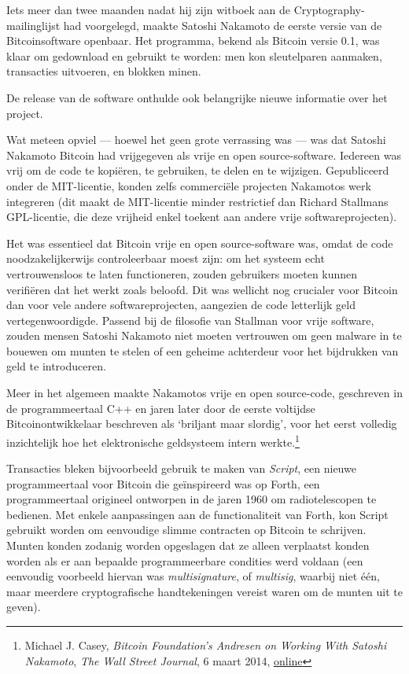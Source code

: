 \documentclass[
  a5paper,
  smalldemyvopaper,11pt,twoside,onecolumn,openright,extrafontsizes,
hidelinks]{memoir}
\begin{document}
Iets meer dan twee maanden nadat hij zijn witboek aan de
Cryptography-mailinglijst had voorgelegd, maakte Satoshi Nakamoto de
eerste versie van de Bitcoinsoftware openbaar. Het programma, bekend als
Bitcoin versie 0.1, was klaar om gedownload en gebruikt te worden: men
kon sleutelparen aanmaken, transacties uitvoeren, en blokken minen.

De release van de software onthulde ook belangrijke nieuwe informatie
over het project.

Wat meteen opviel --- hoewel het geen grote verrassing was --- was dat
Satoshi Nakamoto Bitcoin had vrijgegeven als vrije en open
source-software. Iedereen was vrij om de code te kopiëren, te gebruiken,
te delen en te wijzigen. Gepubliceerd onder de MIT-licentie, konden
zelfs commerciële projecten Nakamotos werk integreren (dit maakt de
MIT-licentie minder restrictief dan Richard Stallmans GPL-licentie, die
deze vrijheid enkel toekent aan andere vrije softwareprojecten).

Het was essentieel dat Bitcoin vrije en open source-software was, omdat
de code noodzakelijkerwijs controleerbaar moest zijn: om het systeem
echt vertrouwensloos te laten functioneren, zouden gebruikers moeten
kunnen verifiëren dat het werkt zoals beloofd. Dit was wellicht nog
crucialer voor Bitcoin dan voor vele andere softwareprojecten, aangezien
de code letterlijk geld vertegenwoordigde. Passend bij de filosofie van
Stallman voor vrije software, zouden mensen Satoshi Nakamoto niet moeten
vertrouwen om geen malware in te bouewen om munten te stelen of een
geheime achterdeur voor het bijdrukken van geld te introduceren.

Meer in het algemeen maakte Nakamotos vrije en open source-code,
geschreven in de programmeertaal C++ en jaren later door de eerste
voltijdse Bitcoinontwikkelaar beschreven als `briljant maar slordig',
voor het eerst volledig inzichtelijk hoe het elektronische geldsysteem
intern werkte.\footnote{Michael J. Casey, \emph{Bitcoin Foundation's
  Andresen on Working With Satoshi Nakamoto}, \emph{The Wall Street
  Journal}, 6 maart 2014,
  \href{https://www.wsj.com/articles/BL-MBB-17626}{online}}

Transacties bleken bijvoorbeeld gebruik te maken van \emph{Script}, een
nieuwe programmeertaal voor Bitcoin die geïnspireerd was op Forth, een
programmeertaal origineel ontworpen in de jaren 1960 om radiotelescopen
te bedienen. Met enkele aanpassingen aan de functionaliteit van Forth,
kon Script gebruikt worden om eenvoudige slimme contracten op Bitcoin te
schrijven. Munten konden zodanig worden opgeslagen dat ze alleen
verplaatst konden worden als er aan bepaalde programmeerbare condities
werd voldaan (een eenvoudig voorbeeld hiervan was \emph{multisignature},
of \emph{multisig}, waarbij niet één, maar meerdere cryptografische
handtekeningen vereist waren om de munten uit te geven).
\end{document}
